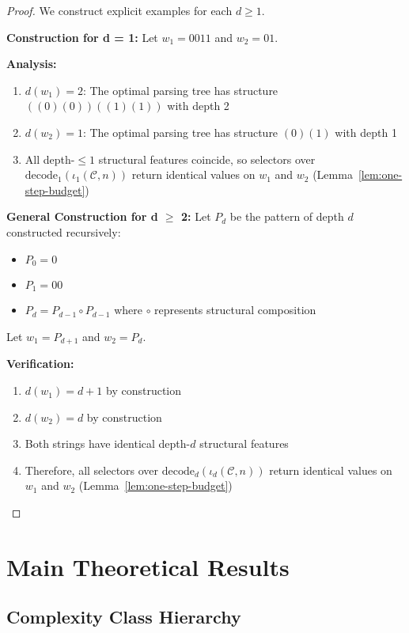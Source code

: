 \begin{proof}
We construct explicit examples for each $d \geq 1$.

\textbf{Construction for d = 1:}
Let $w_1 = 0011$ and $w_2 = 01$.

\textbf{Analysis:}
\begin{enumerate}
\item $d(w_1) = 2$: The optimal parsing tree has structure $((0)(0))((1)(1))$ with depth 2
\item $d(w_2) = 1$: The optimal parsing tree has structure $(0)(1)$ with depth 1
\item All depth-$\le 1$ structural features coincide, so selectors over $\mathrm{decode}_1(\iota_1(\mathcal{C},n))$ return identical values on $w_1$ and $w_2$ (Lemma~\ref{lem:one-step-budget})
\end{enumerate}

\textbf{General Construction for d \ensuremath{\geq} 2:}
Let $P_d$ be the pattern of depth $d$ constructed recursively:
\begin{itemize}
\item $P_0 = 0$
\item $P_1 = 00$
\item $P_d = P_{d-1} \circ P_{d-1}$ where $\circ$ represents structural composition
\end{itemize}

Let $w_1 = P_{d+1}$ and $w_2 = P_d$.

\textbf{Verification:}
\begin{enumerate}
\item $d(w_1) = d+1$ by construction
\item $d(w_2) = d$ by construction
\item Both strings have identical depth-$d$ structural features
\item Therefore, all selectors over $\mathrm{decode}_d(\iota_d(\mathcal{C},n))$ return identical values on $w_1$ and $w_2$ (Lemma~\ref{lem:one-step-budget})
\end{enumerate}
\end{proof}

\section{Main Theoretical Results}

\subsection{Complexity Class Hierarchy}

